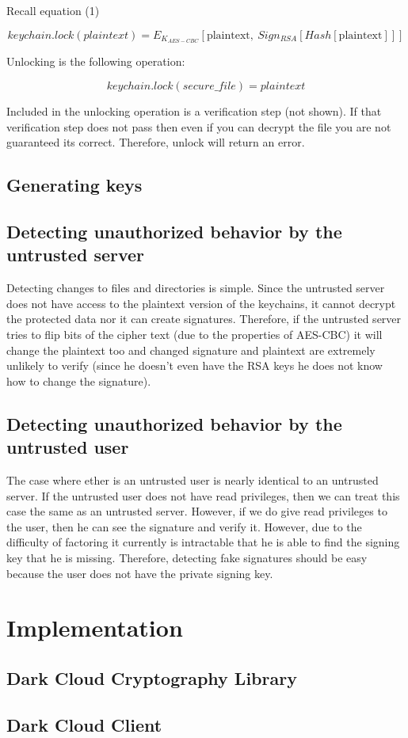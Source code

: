 \documentclass[a4paper]{article}
\begin{document}
Recall equation (1)

\begin{equation}
 keychain.lock(plaintext) = E_{K_{AES-CBC}}[\text{plaintext} , \ Sign_{RSA} [Hash[\text{plaintext}] ] ] \tag{1}\label{eq:simple}
\end{equation}

Unlocking is the following operation:

\begin{equation}
keychain.lock(secure\_file) = plaintext
\end{equation}

Included in the unlocking operation is a verification step (not shown). If that verification step does not pass then even if you can decrypt the file you are not guaranteed its correct. Therefore, unlock will return an error.

\subsection{Generating keys}

\subsection{Detecting unauthorized behavior by the untrusted server}

Detecting changes to files and directories is simple. Since the untrusted server does not have access to the plaintext version of the keychains, it cannot decrypt the protected data nor it can create signatures. Therefore, if the untrusted server tries to flip bits of the cipher text (due to the properties of AES-CBC) it will change the plaintext too and changed signature and plaintext are extremely unlikely to verify (since he doesn't even have the RSA keys he does not know how to change the signature).

\subsection{Detecting unauthorized behavior by the untrusted user}

The case where ether is an untrusted user is nearly identical to an untrusted server. If the untrusted user does not have read privileges, then we can treat this case the same as an untrusted server. However, if we do give read privileges to the user, then he can see the signature and verify it. However, due to the difficulty of factoring it currently is intractable that he is able to find the signing key that he is missing. Therefore, detecting fake signatures should be easy because the user does not have the private signing key.


\section{Implementation}

\subsection{Dark Cloud Cryptography Library}

\subsubsection{}

\subsection{Dark Cloud Client}
\end{document}
